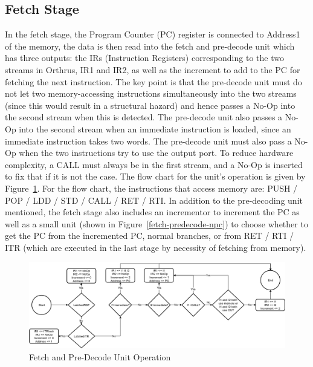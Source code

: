 \documentclass[12pt]{article}
\theoremstyle{plain}
\theoremstyle{definition}
\begin{document}
\subsection{Fetch Stage}
In the fetch stage, the Program Counter (PC) register is connected to Address1 of the memory, the data is then read into the fetch and pre-decode unit which has three outputs: the IRs (Instruction Registers) corresponding to the two streams in Orthrus, IR1 and IR2, as well as the increment to add to the PC for fetching the next instruction. The key point is that the pre-decode unit must do not let two memory-accessing instructions simultaneously into the two streams (since this would result in a structural hazard) and hence passes a No-Op into the second stream when this is detected. The pre-decode unit also passes a No-Op into the second stream when an immediate instruction is loaded, since an immediate instruction takes two words. The pre-decode unit must also pass a No-Op when the two instructions try to use the output port. To reduce hardware complexity, a CALL must always be in the first stream, and a No-Op is inserted to fix that if it is not the case. The flow chart for the unit's operation is given by Figure~\ref{fetch-pre-decode-unit}. For the flow chart, the instructions that access memory are: PUSH / POP / LDD / STD / CALL / RET / RTI. In addition to the pre-decoding unit mentioned, the fetch stage also includes an incrementor to increment the PC as well as a small unit (shown in Figure~\ref{fetch-predecode-npc}) to choose whether to get the PC from the incremented PC, normal branches, or from RET / RTI / ITR (which are executed in the last stage by necessity of fetching from memory).

\begin{figure}
    \centering
    \includegraphics[width=\textwidth]{Diagrams/fetch_predecode_su}
    \caption{Fetch and Pre-Decode Unit Operation}
    \label{fetch-pre-decode-unit}
\end{figure}
\end{document}
